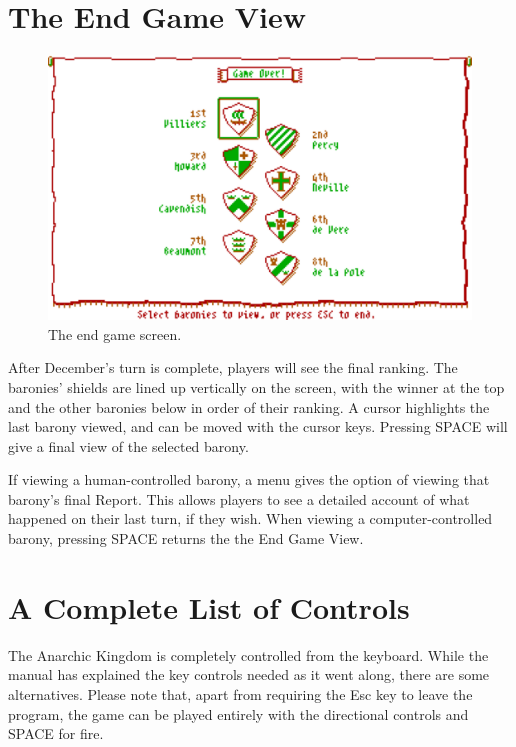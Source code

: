 \documentclass[8pt]{extarticle}
\begin{document}
%
%

\pagebreak %
\section*{The End Game View}

\begin{figure}
  \centering
  \includegraphics[width=\textwidth]{rankings}
  \caption*{The end game screen.}
  \label{fig:title}
\end{figure}

\begin{multicols}{2}
\noindent
After December's turn is complete, players will see the final ranking. The baronies' shields are lined up vertically on the screen, with the winner at the top and the other baronies below in order of their ranking. A cursor highlights the last barony viewed, and can be moved with the cursor keys. Pressing SPACE will give a final view of the selected barony.

If viewing a human-controlled barony, a menu gives the option of viewing that barony's final Report. This allows players to see a detailed account of what happened on their last turn, if they wish. When viewing a computer-controlled barony, pressing SPACE returns the the End Game View.
\end{multicols}

%
%

\pagebreak %
\section*{A Complete List of Controls}

\noindent
The Anarchic Kingdom is completely controlled from the keyboard. While the manual has explained the key controls needed as it went along, there are some alternatives. Please note that, apart from requiring the Esc key to leave the program, the game can be played entirely with the directional controls and SPACE for fire.
\end{document}
